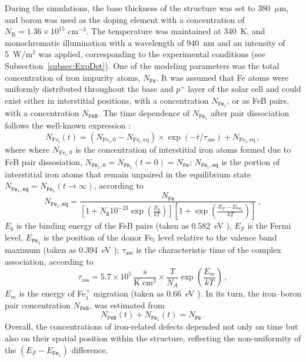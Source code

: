 \documentclass[10pt]{iopart}
\begin{document}
During the simulations, the base thickness of the structure was set to 380~$\mu$m,
and boron was used as the doping element with a concentration of $N_\mathrm{B} = 1.36 \times 10^{15}$ cm$^{-3}$.
The temperature was maintained at 340~K, and monochromatic illumination with a wavelength of  940~nm and an intensity of 5~W/m$^{2}$
was applied, corresponding to the experimental conditions (see Subsection~\ref{subsec:ExpDet}).
One of the modeling parameters was the total concentration of iron impurity atoms, $N_\mathtt{Fe}$.
It was assumed that Fe atoms were uniformly distributed throughout the base and $p^+$ layer of the solar cell
and could exist either in interstitial positions, with a concentration $N_\mathtt{Fe_i}$, or as FeB pairs, with a concentration $N_\mathtt{FeB}$.
The time dependence of $N_\mathtt{Fe_i}$ after pair dissociation follows the well-known expression \cite{MurphyJAP2011, Wijaranakula}:
\begin{equation}
\label{eqNFet}
N_\mathrm{Fe_i}(t)=(N_\mathrm{Fe_i,0}-N_\mathrm{Fe_i,eq})\times
\exp(-t/\tau_\mathrm{ass})+N_\mathrm{Fe_i,eq}\,,
\end{equation}
where
where $N_\mathrm{Fe_i,0}$ is the concentration of interstitial iron atoms formed due to FeB pair dissosiation,
$N_\mathtt{Fe_i,0} = N_\mathtt{Fe_i}(t=0) = N_\mathtt{Fe}$;
$N_\mathtt{Fe_i,eq}$ is the portion of interstitial iron atoms that remain unpaired in the equilibrium state
$N_\mathtt{Fe_i,eq}=N_\mathtt{Fe_i}(t \rightarrow \infty)$,
according to \cite{MurphyJAP2011, Wijaranakula}
\begin{equation}\label{eqFeieq}
  N_\mathtt{Fe_i,eq}=\frac{N_\mathtt{Fe}}{\left[1+N_\mathtt{B}10^{-23}\exp\left(\frac{E_b}{kT}\right)\right]
  \left[1+\exp\left(\frac{E_F-E_\mathtt{Fe_i}}{kT}\right)\right]}\,,
\end{equation}
$E_b$ is the binding energy of the FeB pairs (taken as 0.582~eV \cite{Wijaranakula}),
$E_F$ is the Fermi level,
$E_\mathtt{Fe_i}$ is the position of the donor Fe$_i$ level relative to the valence band maximum
(taken as 0.394~eV \cite{FeBAssJAP2014});
$\tau_\mathrm{ass}$ is the characteristic time of the complex association,
according to \cite{FeBKin2019,FeBAssJAP2014,FeBAssSST2011}
\begin{equation}
\label{eqTass}
\tau_\mathrm{ass}=5.7\times10^5\,\frac{\mathrm{s}}{\mathrm{K}\;\mathrm{cm}^3}\times\frac{T}{N_A}\exp\left(\frac{E_m}{kT}\right)\,,
\end{equation}
$E_m$ is the energy of Fe$_\mathtt{i}^+$ migration (taken as 0.66~eV \cite{FeBAssJAP2014,FeBKin2019,FeBAssSST2011}).
In its turn, the iron–boron pair concentration $N_\mathtt{FeB}$, was estimated from
\begin{equation}\label{eqNFeB}
  N_\mathtt{FeB}(t)+N_\mathtt{Fe_i}(t)=N_\mathtt{Fe}\,.
\end{equation}
Overall, the concentrations of iron-related defects depended not only on time but
also on their spatial position within the structure, reflecting the non-uniformity of the $(E_F-E_\mathtt{Fe_i})$ difference.
\end{document}
